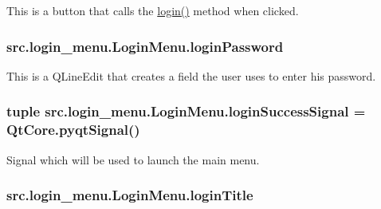 This is a button that calls the \hyperlink{classsrc_1_1login__menu_1_1_login_menu_a75303935e17e43388fd4ef3df029944e}{login()} method when clicked. 

\hypertarget{classsrc_1_1login__menu_1_1_login_menu_a6c0c5ab8b48e62ccb26a472e6e7790c9}{}
\subsubsection[{login\+Password}]{\setlength{\rightskip}{0pt plus 5cm}src.\+login\+\_\+menu.\+Login\+Menu.\+login\+Password}\label{classsrc_1_1login__menu_1_1_login_menu_a6c0c5ab8b48e62ccb26a472e6e7790c9}


This is a Q\+Line\+Edit that creates a field the user uses to enter his password. 

\hypertarget{classsrc_1_1login__menu_1_1_login_menu_a0c7d684b7c11fd92f8de9beee9cf2a9f}{}
\subsubsection[{login\+Success\+Signal}]{\setlength{\rightskip}{0pt plus 5cm}tuple src.\+login\+\_\+menu.\+Login\+Menu.\+login\+Success\+Signal = Qt\+Core.\+pyqt\+Signal()\hspace{0.3cm}{\ttfamily [static]}}\label{classsrc_1_1login__menu_1_1_login_menu_a0c7d684b7c11fd92f8de9beee9cf2a9f}


Signal which will be used to launch the main menu. 

\hypertarget{classsrc_1_1login__menu_1_1_login_menu_adce86324539cbf7d5a398d8afba6a439}{}
\subsubsection[{login\+Title}]{\setlength{\rightskip}{0pt plus 5cm}src.\+login\+\_\+menu.\+Login\+Menu.\+login\+Title}\label{classsrc_1_1login__menu_1_1_login_menu_adce86324539cbf7d5a398d8afba6a439}


